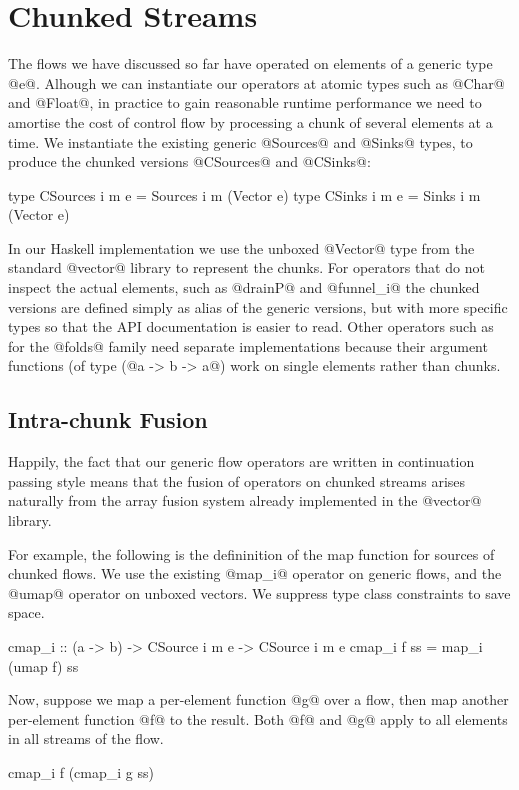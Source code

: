 \section{Chunked Streams}
\label{s:Chunked}
The flows we have discussed so far have operated on elements of a generic type @e@. Alhough we can instantiate our operators at atomic types such as @Char@ and @Float@, in practice to gain reasonable runtime performance we need to amortise the cost of control flow by processing a chunk of several elements at a time. We instantiate the existing generic @Sources@ and @Sinks@ types, to produce the chunked versions @CSources@ and @CSinks@:
\begin{code}
   type CSources i m e = Sources i m (Vector e)
   type CSinks   i m e = Sinks   i m (Vector e)
\end{code}

In our Haskell implementation we use the unboxed @Vector@ type from the standard @vector@ library to represent the chunks. For operators that do not inspect the actual elements, such as @drainP@ and @funnel_i@ the chunked versions are defined simply as alias of the generic versions, but with more specific types so that the API documentation is easier to read. Other operators such as for the @folds@ family need separate implementations because their argument functions (of type (@a -> b -> a@) work on single elements rather than chunks. 


\subsection{Intra-chunk Fusion}
Happily, the fact that our generic flow operators are written in continuation passing style means that the fusion of operators on chunked streams arises naturally from the array fusion system already implemented in the @vector@ library.

For example, the following is the defininition of the map function for sources of chunked flows. We use the existing @map_i@ operator on generic flows, and the @umap@ operator on unboxed vectors. We suppress type class constraints to save space.
\begin{code}
   cmap_i :: (a -> b) 
          -> CSource i m e -> CSource i m e
   cmap_i f ss = map_i (umap f) ss
\end{code}

Now, suppose we map a per-element function @g@ over a flow, then map another per-element function @f@ to the result. Both @f@ and @g@ apply to all elements in all streams of the flow.
\begin{code}
   cmap_i f (cmap_i g ss)
\end{code}


